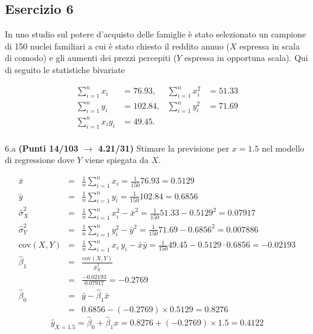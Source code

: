 \documentclass[
  11pt,
]{book}
\theoremstyle{mytheoremstyle}
\theoremstyle{mydefstyle}
\newenvironment{sol}
  {
  \begin{tcolorbox}[enhanced,breakable,arc=0.1mm,boxrule=1pt,colback=white,colframe=iblue,
  title=\bf \fontfamily{lmss}\selectfont \hspace{.5 cm} Soluzione,drop fuzzy shadow]

}{
\end{tcolorbox}
  }
\begin{document}
\subsection{Esercizio 6}\label{esercizio-6-18}

In uno studio sul potere d'acquisto delle famiglie è stato selezionato un campione di 150 nuclei familiari
a cui è stato chiesto il reddito annuo (\(X\) espressa in scala di comodo) e gli aumenti dei prezzi percepiti (\(Y\) espressa in opportuna scala). Qui di seguito le statistiche bivariate

\begin{align*}
\sum_{i=1}^n x_i &= 76.93,   &\sum_{i=1}^n x_i^2 &= 51.33 \\
\sum_{i=1}^n y_i &= 102.84,   &\sum_{i=1}^n y_i^2 &= 71.69 \\
\sum_{i=1}^n x_iy_i &= 49.45.    \\
\end{align*}

6.a \textbf{(Punti 14/103 \(\rightarrow\) 4.21/31)} Stimare la previsione per \(x=1.5\) nel modello di regressione dove \(Y\) viene spiegata da \(X\).

\begin{sol}
\begin{eqnarray*}
           \bar x &=&\frac 1 n\sum_{i=1}^n x_i = \frac {1}{ 150 }  76.93 =  0.5129 \\
           \bar y &=&\frac 1 n\sum_{i=1}^n y_i = \frac {1}{ 150 }  102.84 =  0.6856 \\
           \hat\sigma_X^2&=&\frac 1 n\sum_{i=1}^n x_i^2-\bar x^2=\frac {1}{ 150 }  51.33  - 0.5129 ^2= 0.07917 \\
           \hat\sigma_Y^2&=&\frac 1 n\sum_{i=1}^n y_i^2-\bar y^2=\frac {1}{ 150 }  71.69  - 0.6856 ^2= 0.007886 \\
           \text{cov}(X,Y)&=&\frac 1 n\sum_{i=1}^n x_i~y_i-\bar x\bar y=\frac {1}{ 150 }  49.45 - 0.5129 \cdot 0.6856 = -0.02193 \\
           \hat\beta_1 &=& \frac{\text{cov}(X,Y)}{\hat\sigma_X^2} \\
                    &=& \frac{ -0.02193 }{ 0.07917 }  =  -0.2769 \\
           \hat\beta_0 &=& \bar y - \hat\beta_1 \bar x\\
                    &=&  0.6856 - (-0.2769) \times  0.5129 = 0.8276 
         \end{eqnarray*}\[\hat y_{X= 1.5 }=\hat\beta_0+\hat\beta_1 x= 0.8276 + (-0.2769) \times 1.5 = 0.4122 \]

\end{sol}
\end{document}
